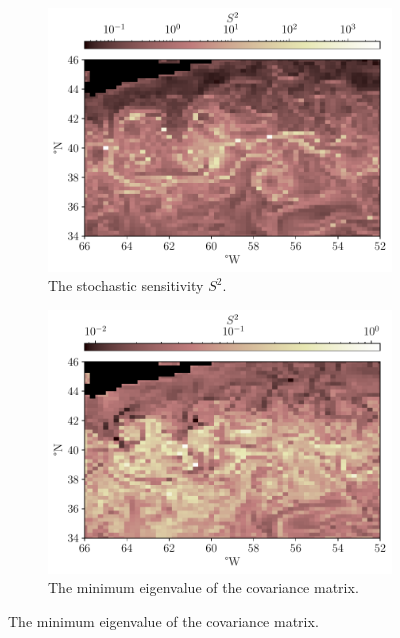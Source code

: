 \begin{figure}
	\begin{center}
		\begin{subfigure}[t]{0.49\textwidth}
			\includegraphics[width=\textwidth]{chp06_applications/figures/gulf_stream/S2_field_grid}
			\caption{The stochastic sensitivity \(S^2\).}
			\label{fig:na_S2}
		\end{subfigure}
		\begin{subfigure}[t]{0.49\textwidth}
			\includegraphics[width=\textwidth]{chp06_applications/figures/gulf_stream/s2min_field_grid}
			\caption{The minimum eigenvalue of the covariance matrix.}
		\end{subfigure}

\end{center}
\end{figure}
